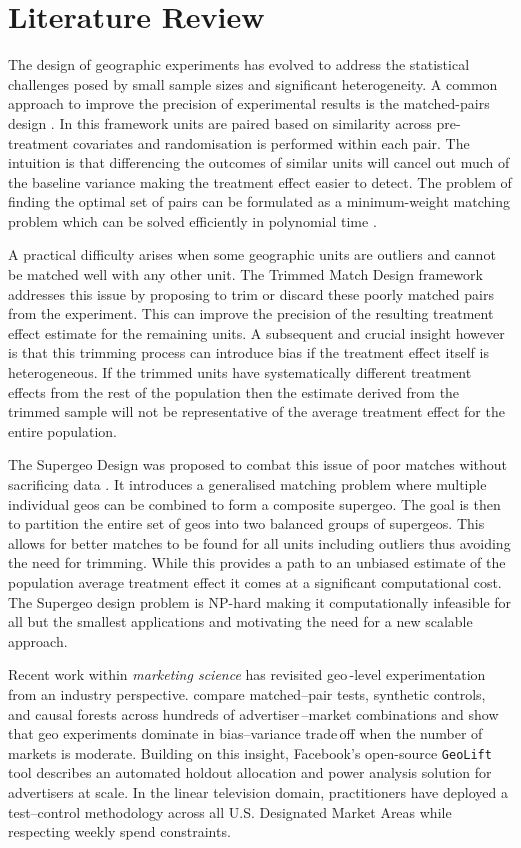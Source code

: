 \documentclass[final,3p,fleqn, 10pt]{elsarticle}
\begin{document}
\section{Literature Review}
\label{sec:literature}
The design of geographic experiments has evolved to address the statistical challenges posed by small sample sizes and significant heterogeneity. A common approach to improve the precision of experimental results is the matched-pairs design \citep{imbens2015causal}. In this framework units are paired based on similarity across pre-treatment covariates and randomisation is performed within each pair. The intuition is that differencing the outcomes of similar units will cancel out much of the baseline variance making the treatment effect easier to detect. The problem of finding the optimal set of pairs can be formulated as a minimum-weight matching problem which can be solved efficiently in polynomial time \citep{edmonds1965maximum, rosenbaum2020design}.

A practical difficulty arises when some geographic units are outliers and cannot be matched well with any other unit. The Trimmed Match Design framework \citep{chen2021} addresses this issue by proposing to trim or discard these poorly matched pairs from the experiment. This can improve the precision of the resulting treatment effect estimate for the remaining units. A subsequent and crucial insight however is that this trimming process can introduce bias if the treatment effect itself is heterogeneous. If the trimmed units have systematically different treatment effects from the rest of the population then the estimate derived from the trimmed sample will not be representative of the average treatment effect for the entire population.

The Supergeo Design was proposed to combat this issue of poor matches without sacrificing data \citep{chen2023}. It introduces a generalised matching problem where multiple individual geos can be combined to form a composite supergeo. The goal is then to partition the entire set of geos into two balanced groups of supergeos. This allows for better matches to be found for all units including outliers thus avoiding the need for trimming. While this provides a path to an unbiased estimate of the population average treatment effect it comes at a significant computational cost. The Supergeo design problem is NP-hard making it computationally infeasible for all but the smallest applications and motivating the need for a new scalable approach.

Recent work within \emph{marketing science} has revisited geo\,-level experimentation from an industry perspective. \citet{gordon2021advertising} compare matched--pair tests, synthetic controls, and causal forests across hundreds of advertiser\,–market combinations and show that geo experiments dominate in bias--variance trade\,off when the number of markets is moderate. Building on this insight, Facebook's open-source \texttt{GeoLift} tool describes an automated holdout allocation and power analysis solution for advertisers at scale. In the linear television domain, practitioners have deployed a test--control methodology across all U.S. Designated Market Areas while respecting weekly spend constraints.
\end{document}
